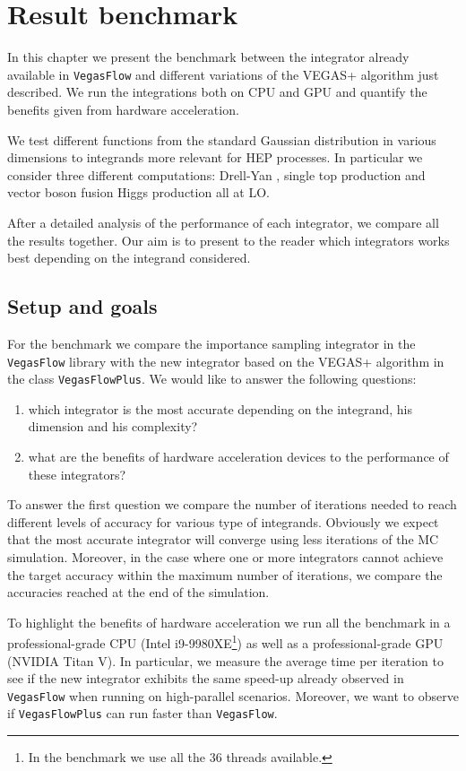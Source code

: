 \documentclass[../main/main.tex]{subfiles}
\begin{document}
\chapter{Result benchmark}
	
In this chapter we present the benchmark between the integrator already available in \texttt{VegasFlow} and different variations of the VEGAS+ algorithm just described. We run the integrations both on CPU and GPU and quantify the benefits given from hardware acceleration.

We test different functions from the standard Gaussian distribution in various dimensions to integrands more relevant for HEP processes. In particular we consider three different computations: Drell-Yan \cite{Carrazza_2020}, single top production \cite{Brucherseifer_2014} and vector boson fusion Higgs production \cite{Carrazza_2021} all at LO.

After a detailed analysis of the performance of each integrator, we compare all the results together. Our aim is to present to the reader which integrators works best depending on the integrand considered.
\section{Setup and goals}
For the benchmark we compare the importance sampling integrator in the \texttt{VegasFlow} library with the new integrator based on the VEGAS+ algorithm  in the class \texttt{VegasFlowPlus}.
We would like to answer the following questions:
\begin{enumerate}
	\item which integrator is the most accurate depending on the integrand, his dimension and his complexity?
	\item what are the benefits of hardware acceleration devices to the performance of these integrators?
\end{enumerate}

To answer the first question we compare the number of iterations needed to reach different levels of accuracy for various type of integrands.
Obviously we expect that the most accurate integrator will converge using less iterations of the MC simulation. Moreover, in the case where one or more integrators cannot achieve the target accuracy within the maximum number of iterations, we compare the accuracies reached at the end of the simulation.

To highlight the benefits of hardware acceleration we run all the benchmark in a professional-grade CPU (Intel i9-9980XE\footnote{In the benchmark we use all the 36 threads available.}) as well as a professional-grade GPU (NVIDIA Titan V). In particular, we measure the average time per iteration to see if the new integrator exhibits the same speed-up already observed in \texttt{VegasFlow} when running on 
high-parallel scenarios. Moreover, we want to observe if \texttt{VegasFlowPlus} can run faster than \texttt{VegasFlow}.
\end{document}
